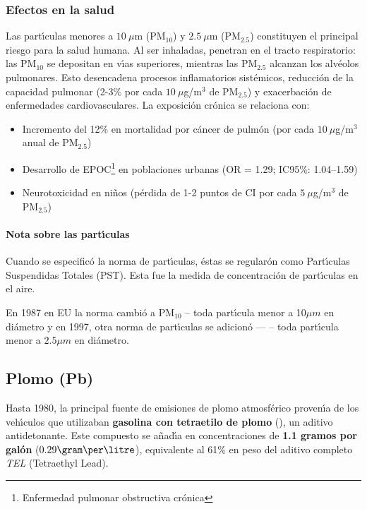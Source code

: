 \subsubsection{Efectos en la salud} 
Las part\'{\i}culas menores a $10\ \mu$m (PM$_{10}$) y $2.5\ \mu$m (PM$_{2.5}$) constituyen el principal riesgo para la salud humana. Al ser inhaladas, penetran en el tracto respiratorio: las PM$_{10}$ se depositan en v\'{\i}as superiores, mientras las PM$_{2.5}$ alcanzan los alv\'eolos pulmonares. Esto desencadena procesos inflamatorios sist\'emicos, reducci\'on de la capacidad pulmonar (2-3\% por cada $10\ \mu$g/m$^3$ de PM$_{2.5}$) y exacerbaci\'on de enfermedades cardiovasculares. La exposici\'on cr\'onica se relaciona con:
\begin{itemize}
    \item Incremento del 12\% en mortalidad por c\'ancer de pulm\'on (por cada $10\ \mu$g/m$^3$ anual de PM$_{2.5}$) 
    \item Desarrollo de EPOC\footnote{Enfermedad pulmonar obstructiva cr\'onica} en poblaciones urbanas (OR = 1.29; IC95\%: 1.04–1.59)
    \item Neurotoxicidad en ni\~nos (p\'erdida de 1-2 puntos de CI por cada $5\ \mu$g/m$^3$ de PM$_{2.5}$)
\end{itemize}

\paragraph{Nota sobre las part\'{\i}culas}
Cuando se especific\'o la norma de part\'{\i}culas, \'estas se regular\'on como Part\'{\i}culas Suspendidas Totales (PST). Esta fue la medida de concentraci\'on de part\'{\i}culas en el aire.

En 1987 en EU la norma cambi\'o a PM$_{10}$ -- toda part\'{\i}cula menor a 10$\mu m$ en di\'ametro y en 1997, otra norma de part\'{\i}culas se adicion\'o ---  -- toda part\'{\i}cula menor a $2.5\mu m$ en di\'ametro.

\subsection{Plomo (Pb)}
Hasta 1980, la principal fuente de emisiones de plomo atmosf\'erico proven\'{\i}a de los veh\'{\i}culos que utilizaban \textbf{gasolina con tetraetilo de plomo} (), un aditivo antidetonante. Este compuesto se a\~nad\'{\i}a en concentraciones de \textbf{1.1 gramos por gal\'on} ($ 0.29 \gram\per\litre$), equivalente al 61\% en peso del aditivo completo \textit{TEL} (Tetraethyl Lead). 

